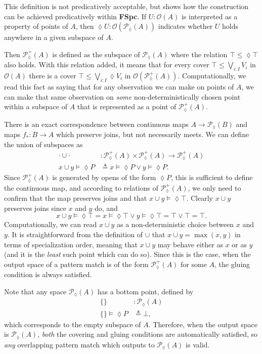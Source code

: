 \documentclass[conference]{IEEEtran}
\newcommand{\PLower}{\mathcal{P}_\lozenge}
\newcommand{\Open}[1]{\mathcal{O}({#1})}
\begin{document}
This definition is not predicatively acceptable, but \cite{vickersdoublepowerlocale} shows how the construction can be achieved predicatively within \textbf{FSpc}. If $U : \Open{A}$ is interpreted as a property of points of $A$, then $\lozenge U : \Open{\PLower(A)}$ indicates whether $U$ holds anywhere in a given subspace of $A$.

Then $\PLower^+(A)$ is defined as the subspace of $\PLower(A)$ where the relation $\top \le \lozenge \top$ also holds. With this relation added, it means that for every cover $\top \le \bigvee_{i : I} V_i$ in $\Open{A}$ there is a cover $\top \le \bigvee_{i : I} \lozenge V_i$ in $\Open{\PLower^+(A)}$. Computationally, we read this fact as saying that for any observation we can make on points of $A$, we can make that same observation on \emph{some} non-deterministically chosen point within a subspace of $A$ that is represented as a point of $\PLower^+(A)$.

There is an exact correspondence between continuous maps $A \to \PLower(B)$ and maps $f_* : B \to A$ which preserve joins, but not necessarily meets. We can define the union of subspaces as
\begin{align*}
\cdot \cup \cdot &: \PLower^+(A) \times \PLower^+(A) \to \PLower^+(A)
\\ x \cup y \models \lozenge P &\triangleq x \models \lozenge P \vee y \models \lozenge P.
\end{align*}
Since $\PLower^+(A)$ is generated by opens of the form $\lozenge P$, this is sufficient to define the continuous map, and according to relations of $\PLower^+(A)$, we only need to confirm that the map preserves joins and that $x \cup y \models \lozenge \top$. Clearly $x \cup y$ preserves joins since $x$ and $y$ do, and 
\[
x \cup y \models \lozenge \top = x \models \lozenge \top \vee y \models \lozenge \top = \top \vee \top = \top.
\]
Computationally, we can read $x \cup y$ as a non-deterministic choice between $x$ and $y$.
It is straightforward from the definition of $\cup$ that $x \cup y = \max(x, y)$ in terms of specialization order, meaning that $x \cup y$ may behave either as $x$ or as $y$ (and it is the \emph{least} such point which can do so). Since this is the case, when the output space of a pattern match is of the form $\PLower^+(A)$ for some $A$, the gluing condition is always satisfied.

Note that any space $\PLower(A)$ has a bottom point, defined by
\begin{align*}
\{ \} &: \PLower(A)
\\ \{ \} \models \lozenge P &\triangleq \bot,
\end{align*}
which corresponds to the empty subspace of $A$. Therefore, when the output space is $\PLower(A)$, \emph{both} the covering and gluing conditions are automatically satisfied, so \emph{any} overlapping pattern match which outputs to $\PLower(A)$ is valid.
\end{document}
